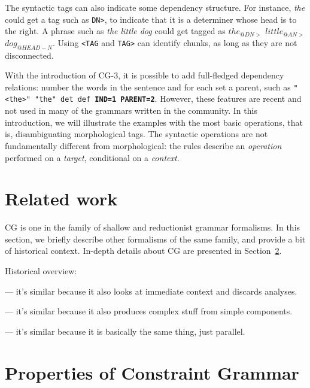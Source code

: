 The syntactic tags can also indicate some dependency structure. For
instance, \emph{the} could get a tag such as
\texttt{DN\textgreater}, to indicate that it is a determiner whose
head is to the right. A phrase such as \emph{the little dog} could get
tagged as  $the_{@DN>}$ $little_{@AN>}$ $dog_{@HEAD-N}$.
Using \texttt{\textless{}TAG} and \texttt{TAG\textgreater} can identify
chunks, as long as they are not disconnected.

With the introduction of CG-3, it is possible to add full-fledged dependency
relations: number the words in the sentence and for each set a parent,
such as \texttt{"<the>" "the" det def  \textbf{IND=1 PARENT=2}}. 
However, these features are recent and not used in many of the grammars written 
in the community. In this introduction, we will illustrate the examples with the 
most basic operations, that is, disambiguating morphological tags.
The syntactic operations are not fundamentally
different from morphological: the rules describe an \emph{operation}
performed on a \emph{target}, conditional on a \emph{context}.


\section{Related work}

CG is one in the family of shallow and reductionist grammar formalisms. In this section, we briefly describe other formalisms of the same family, and provide a bit of historical context. In-depth details about CG are presented in Section~\ref{properties}.

Historical overview:

 --- it's similar because it also looks at immediate context and discards analyses.



 --- it's similar because it also produces complex stuff from simple components.

 --- it's similar because it is basically the same thing, just parallel.



\section{Properties of Constraint Grammar}\label{properties}

